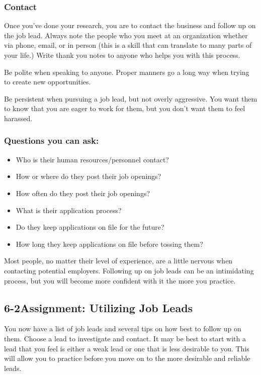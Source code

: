 \subsubsection*{Contact}

Once you've done your research, you are to contact the business and follow up on the job lead. Always note the people who you meet at an organization whether via phone, email, or in person (this is a skill that can translate to many parts of your life.) Write thank you notes to anyone who helps you with this process.

Be polite when speaking to anyone. Proper manners go a long way when trying to create new opportunities.

Be persistent when pursuing a job lead, but not overly aggressive. You want them to know that you are eager to work for them, but you don't want them to feel harassed.

\subsubsection*{Questions you can ask:}
\begin{itemize}[leftmargin=*]
\item Who is their human resources/personnel contact?
\item How or where do they post their job openings?
\item How often do they post their job openings?
\item What is their application process?
\item Do they keep applications on file for the future?
\item How long they keep applications on file before tossing them?
\end{itemize}
Most people, no matter their level of experience, are a little nervous when contacting potential employers. Following up on job leads can be an intimidating process, but you will become more confident with it the more you practice.

\pagebreak \subsection*{6-2\quad Assignment: Utilizing Job Leads}
You now have a list of job leads and several tips on how best to follow up on them.
Choose a lead to investigate and contact. It may be best to start with a lead that you feel is either a weak lead or one that is less desirable to you. This will allow you to practice before you move on to the more desirable and reliable leads.

